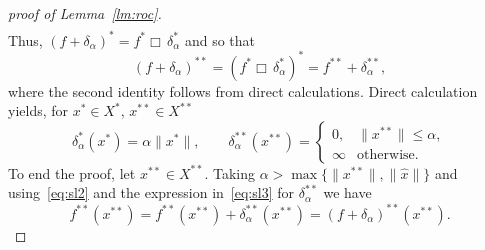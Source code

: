 \documentclass[11pt]{article}
\newcommand{\norm}[1]{\|#1\|}
\begin{document}
\begin{proof}[proof of Lemma~\ref{lm:roc}]
\begin{align*}
\end{align*}
%
Thus, $(f+\delta_\alpha)^*=f^*\Box\, \delta_\alpha^*$ and so that
%
\begin{equation}\label{eq:sl2}
 (f+\delta_\alpha)^{**}=(f^*\Box\, \delta_\alpha^*)^*=f^{**}+\delta_\alpha^{**},
\end{equation}
%
where the second identity follows from direct calculations.
%
Direct calculation yields, for $x^*\in X^*$, $x^{**}\in X^{**}$
\begin{equation}\label{eq:sl3}
\delta_\alpha^*(x^*)=\alpha\norm{x^*},\qquad
 \delta_\alpha^{**}(x^{**})=
 \begin{cases}
  0,& \|x^{**}\|\leq \alpha,\\
  \infty& \mbox{otherwise}.
 \end{cases}
\end{equation}
To end the proof, let $x^{**}\in X^{**}$. Taking
$\alpha>\max\{\norm{x^{**}},\norm{\hat x}\}$ and using~\eqref{eq:sl2}
and the expression in~\eqref{eq:sl3} for $\delta_\alpha^{**}$ we have
\[
 f^{**}(x^{**}) =
f^{**}(x^{**})+\delta_\alpha^{**}(x^{**})
=(f+\delta_\alpha)^{**}(x^{**}).
\]
\end{proof}







%
% 
% 
\end{document}
